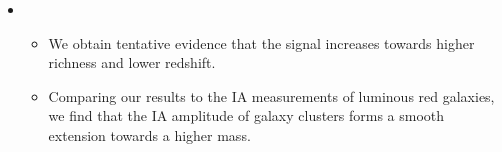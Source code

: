 \documentclass[letterpaper,10pt,english]{sphinxmanual}
\begin{document}
\begin{itemize}
\begin{itemize}
\begin{itemize}
\end{itemize}

\end{itemize}

\item {} 
\begin{itemize}
\item {} 
We obtain tentative evidence that the signal increases towards
higher richness and lower redshift.

\item {} 
Comparing our results to the IA measurements of luminous red
galaxies, we find that the IA amplitude of galaxy clusters forms a
smooth extension towards a higher mass.

\end{itemize}

\end{itemize}
\end{document}
